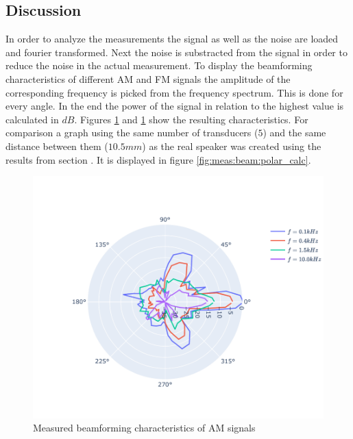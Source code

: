 \subsection{Discussion}
%
In order to analyze the measurements the signal as well as the noise are loaded and fourier transformed. Next the noise is substracted from the signal in order to reduce the noise in the actual measurement.\p
To display the beamforming characteristics of different AM and FM signals the amplitude of the corresponding frequency is picked from the frequency spectrum. This is done for every angle. In the end the power of the signal in relation to the highest value is calculated in $dB$. Figures \ref{fig:meas:beam:polar_meas_am} and \ref{fig:meas:beam:polar_meas_am} show the resulting characteristics.\p
For comparison a graph using the same number of transducers ($5$) and the same distance between them ($10.5mm$) as the real speaker was created using the results from section . It is displayed in figure \ref{fig:meas:beam:polar_calc}.
%
\begin{figure}
  \centering
  \includegraphics[height=\largeheight]{src/assets/pictures/measurements/beamforming_am_polar.pdf}
  \caption{Measured beamforming characteristics of AM signals}\label{fig:meas:beam:polar_meas_am}
\end{figure}
%
